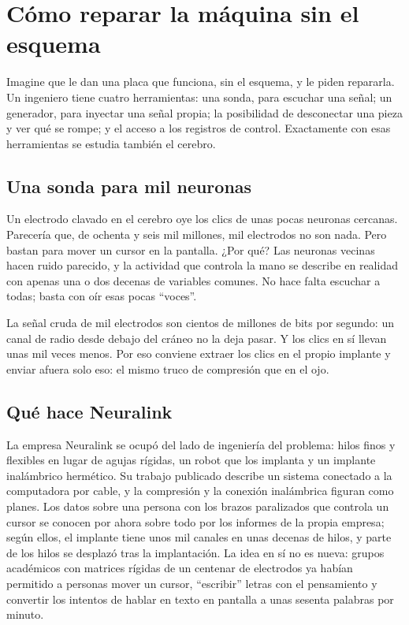 \chapter{Cómo reparar la máquina sin el esquema}


Imagine que le dan una placa que funciona, sin el esquema, y le piden repararla. Un ingeniero tiene cuatro herramientas: una sonda, para escuchar una señal; un generador, para inyectar una señal propia; la posibilidad de desconectar una pieza y ver qué se rompe; y el acceso a los registros de control. Exactamente con esas herramientas se estudia también el cerebro.

\section*{Una sonda para mil neuronas}

Un electrodo clavado en el cerebro oye los clics de unas pocas neuronas cercanas. Parecería que, de ochenta y seis mil millones, mil electrodos no son nada. Pero bastan para mover un cursor en la pantalla. ¿Por qué? Las neuronas vecinas hacen ruido parecido, y la actividad que controla la mano se describe en realidad con apenas una o dos decenas de variables comunes. No hace falta escuchar a todas; basta con oír esas pocas “voces”.

La señal cruda de mil electrodos son cientos de millones de bits por segundo: un canal de radio desde debajo del cráneo no la deja pasar. Y los clics en sí llevan unas mil veces menos. Por eso conviene extraer los clics en el propio implante y enviar afuera solo eso: el mismo truco de compresión que en el ojo.

\section*{Qué hace Neuralink}

La empresa Neuralink se ocupó del lado de ingeniería del problema: hilos finos y flexibles en lugar de agujas rígidas, un robot que los implanta y un implante inalámbrico hermético. Su trabajo publicado describe un sistema conectado a la computadora por cable, y la compresión y la conexión inalámbrica figuran como planes. Los datos sobre una persona con los brazos paralizados que controla un cursor se conocen por ahora sobre todo por los informes de la propia empresa; según ellos, el implante tiene unos mil canales en unas decenas de hilos, y parte de los hilos se desplazó tras la implantación. La idea en sí no es nueva: grupos académicos con matrices rígidas de un centenar de electrodos ya habían permitido a personas mover un cursor, “escribir” letras con el pensamiento y convertir los intentos de hablar en texto en pantalla a unas sesenta palabras por minuto.

